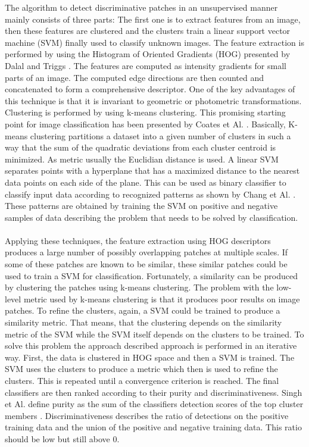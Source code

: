 The algorithm to detect discriminative patches in an unsupervised manner mainly consists of three parts: The first one is to extract features from an image, then these features are clustered and the clusters train a linear support vector machine (SVM) finally used to classify unknown images. The feature extraction is performed by using the Histogram of Oriented Gradients (HOG) presented by Dalal and Triggs \cite{Dalal:2005:HOG:1068507.1069007}. The features are computed as intensity gradients for small parts of an image. The computed edge directions are then counted and concatenated to form a comprehensive descriptor. One of the key advantages of this technique is that it is invariant to geometric or photometric transformations. Clustering is performed by using k-means clustering. This promising starting point for image classification has been presented by Coates et Al. \cite{DBLP:series/lncs/CoatesN12}. Basically, K-means clustering partitions a dataset into a given number of clusters in such a way that the sum of the quadratic deviations from each cluster centroid is minimized. As metric usually the Euclidian distance is used. A linear SVM separates points with a hyperplane that has a maximized distance to the nearest data points on each side of the plane. This can be used as binary classifier to classify input data according to recognized patterns as shown by Chang et Al. \cite{Chang:2011:LLS:1961189.1961199}. These patterns are obtained by training the SVM on positive and negative samples of data describing the problem that needs to be solved by classification.
\\
\\
Applying these techniques, the feature extraction using HOG descriptors produces a large number of possibly overlapping patches at multiple scales. If some of these patches are known to be similar, these similar patches could be used to train a SVM for classification. Fortunately, a similarity can be produced by clustering the patches using k-means clustering. The problem with the low-level metric used by k-means clustering is that it produces poor results on image patches. To refine the clusters, again, a SVM could be trained to produce a similarity metric. That means, that the clustering depends on the similarity metric of the SVM while the SVM itself depends on the clusters to be trained. To solve this problem the approach described approach is performed in an iterative way. First, the data is clustered in HOG space and then a SVM is trained. The SVM uses the clusters to produce a metric which then is used to refine the clusters. This is repeated until a convergence criterion is reached. The final classifiers are then ranked according to their purity and discriminativeness. Singh et Al. define purity as the sum of the classifiers detection scores of the top cluster members \cite{Singh2012DiscPat}. Discriminativeness describes the ratio of detections on the positive training data and the union of the positive and negative training data. This ratio should be low but still above 0.

